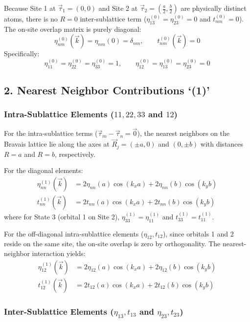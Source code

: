 \documentclass[11pt]{article}
\begin{document}
Because Site 1 at $\vec{\tau}_{1} = (0,0)$ and Site 2 at $\vec{\tau}_{2} = \left(\frac{a}{2}, \frac{b}{2}\right)$ are physically distinct atoms, there is no $R = 0$ inter-sublattice term ($\eta_{13}^{(0)} = \eta_{23}^{(0)} = 0$ and $t_{nm}^{(0)} = 0$). The on-site overlap matrix is purely diagonal:
\[
	\eta_{nm}^{(0)}(\vec{k}) = \eta_{nm}(0) = \delta_{nm}, \qquad t_{nm}^{(0)}(\vec{k}) = 0
\]
Specifically:
\[
\eta_{11}^{(0)} = \eta_{22}^{(0)} = \eta_{33}^{(0)} = 1, \qquad \eta_{12}^{(0)} = \eta_{13}^{(0)} = \eta_{23}^{(0)} = 0
\]

\subsection*{2. Nearest Neighbor Contributions `(1)'}

\subsubsection*{Intra-Sublattice Elements ($11, 22, 33$ and $12$)}

For the intra-sublattice terms ($\vec{\tau}_m - \vec{\tau}_n = \vec{0}$), the nearest neighbors on the Bravais lattice lie along the axes at $\vec{R}_j = (\pm a, 0)$ and $(0, \pm b)$ with distances $R = a$ and $R = b$, respectively.

For the diagonal elements:
\begin{align*}
	\eta^{(1)}_{nn}(\vec{k}) &= 2 \eta_{nn}(a) \cos(k_x a) + 2 \eta_{nn}(b) \cos(k_y b) \\
	t^{(1)}_{nn}(\vec{k}) &= 2 t_{nn}(a) \cos(k_x a) + 2 t_{nn}(b) \cos(k_y b)
\end{align*}
where for State 3 (orbital 1 on Site 2), $\eta^{(1)}_{33} = \eta^{(1)}_{11}$ and $t^{(1)}_{33} = t^{(1)}_{11}$.

For the off-diagonal intra-sublattice elements ($\eta_{12}, t_{12}$), since orbitals 1 and 2 reside on the same site, the on-site overlap is zero by orthogonality. The nearest-neighbor interaction yields:
\begin{align*}
	\eta^{(1)}_{12}(\vec{k}) &= 2 \eta_{12}(a) \cos(k_x a) + 2 \eta_{12}(b) \cos(k_y b) \\
	t^{(1)}_{12}(\vec{k}) &= 2 t_{12}(a) \cos(k_x a) + 2 t_{12}(b) \cos(k_y b)
\end{align*}

\subsubsection*{Inter-Sublattice Elements ($\eta_{13}, t_{13}$ and $\eta_{23}, t_{23}$)}
\end{document}
